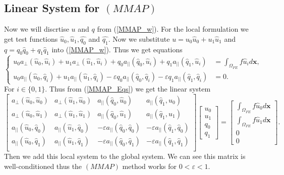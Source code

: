 \documentclass[12pt]{ociamthesis}
\begin{document}
\subsection{Linear System for $(MMAP)$}
Now we will discrtise $u$ and  $q$ from (\ref{MMAP_w}). For the local formulation we get test functions $\hat{u}_0, \hat{u}_1, \hat{q_0}$ and $\hat{q_1}$. Now we substitute $u = u_0 \hat{u}_0 + u_1\hat{u}_1$ and $q = q_0\hat{q}_0 + q_1\hat{q}_1$ into (\ref{MMAP_w}). Thus we get equations
\begin{equation} \label{MMAP_Eqs}
\begin{cases}
u_0a_{\perp}(\hat{u}_0, \hat{u}_i) +
u_1a_{\perp}(\hat{u}_1, \hat{u}_i) +
q_0a_{||}(\hat{q}_0, \hat{u}_i) +
q_1a_{||}(\hat{q}_1, \hat{u}_i) &=
\int_{\Omega_{FE}} f \hat{u}_i d\mathbf{x}, \\
u_0a_{||}(\hat{u}_0, \hat{q}_i) +
u_1a_{||}(\hat{u}_1, \hat{q}_i) -
\varepsilon q_0a_{||}(\hat{q}_0, \hat{q}_i) -
\varepsilon q_1a_{||}(\hat{q}_1, \hat{q}_i) &=
0.
\end{cases}
\end{equation}
For $i\in\{0,1\}$. Thus from (\ref{MMAP_Eqs}) we get the linear system
\begin{equation}
\left [
\begin{matrix}
a_{\perp}(\hat{u}_0, \hat{u}_0) &
a_{\perp}(\hat{u}_1, \hat{u}_0) &
a_{||}(\hat{q}_0, \hat{u}_0) &
a_{||}(\hat{q}_1, \hat{u}_0) \\
a_{\perp}(\hat{u}_0, \hat{u}_1) &
a_{\perp}(\hat{u}_1, \hat{u}_1) &
a_{||}(\hat{q}_0, \hat{u}_1) &
a_{||}(\hat{q}_1, \hat{u}_1) \\
a_{||}(\hat{u}_0, \hat{q}_0) &
a_{||}(\hat{u}_1, \hat{q}_0) &
-\varepsilon a_{||}(\hat{q}_0, \hat{q}_0) &
-\varepsilon a_{||}(\hat{q}_1, \hat{q}_0) \\
a_{||}(\hat{u}_0, \hat{q}_1) &
a_{||}(\hat{u}_1, \hat{q}_1) &
-\varepsilon a_{||}(\hat{q}_0, \hat{q}_1) &
-\varepsilon a_{||}(\hat{q}_1, \hat{q}_1) \\
\end{matrix}
\right ]
\left [
\begin{matrix}
u_0 \\
u_1 \\
q_0 \\
q_1
\end{matrix}
\right ] =
\left [
\begin{matrix}
\int_{\Omega_{FE}}f\hat{u}_0 d \mathbf{x} \\
\int_{\Omega_{FE}}f\hat{u}_1 d \mathbf{x} \\
0 \\
0
\end{matrix}
\right ].
\end{equation}
Then we add this local system to the global system. We can see this matrix is well-conditioned thus the $(MMAP)$ method works for $0<\varepsilon<1$.
\end{document}
